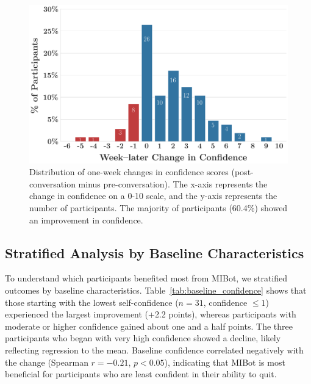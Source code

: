\begin{figure}[ht]
  \centering
  \includegraphics[width=0.8\linewidth]{fig/2024-11-14-MIV6.3A-2024-11-22-MIV6.3A_ruler_deltas_delta_with_week_later_keep_high_conf_False_change.png}
  \caption[Distribution of Confidence Changes]{Distribution of one-week changes in confidence scores (post-conversation minus pre-conversation). The x-axis represents the change in confidence on a 0-10 scale, and the y-axis represents the number of participants. The majority of participants (60.4\%) showed an improvement in confidence.}
  \label{fig:confidence_change_distribution}
\end{figure}



\subsection{Stratified Analysis by Baseline Characteristics}

To understand which participants benefited most from MIBot, we stratified outcomes by baseline characteristics. Table~\ref{tab:baseline_confidence} shows that those starting with the lowest self-confidence ($n=31$, confidence $\leq 1$) experienced the largest improvement (+2.2 points), whereas participants with moderate or higher confidence gained about one and a half points. The three participants who began with very high confidence showed a decline, likely reflecting regression to the mean. Baseline confidence correlated negatively with the change (Spearman $r=-0.21$, $p<0.05$), indicating that MIBot is most beneficial for participants who are least confident in their ability to quit.

